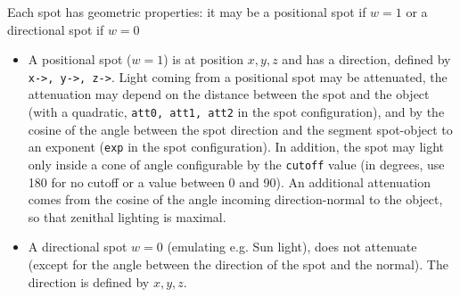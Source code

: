 \documentclass{article}
\begin{document}
Each spot has geometric properties: it may be a positional spot
if $w=1$ or a directional spot if $w=0$
\begin{itemize}
\item  A positional spot ($w=1$) is
at position $x,y,z$ and has a direction, defined by 
\verb|x->, y->, z->|. Light coming from a positional spot may
be attenuated, the attenuation may depend on the distance between
the spot and the object (with a quadratic, 
\verb|att0, att1, att2| in the spot configuration), and by the
cosine of the angle between the spot direction and the segment
spot-object to an exponent (\verb|exp| in the spot configuration).
In addition, the spot may light only inside a cone of angle
configurable by the \verb|cutoff| value (in degrees, use 180
for no cutoff or a value between 0 and 90). An additional attenuation
comes from the cosine of the angle incoming direction-normal to the
object, so that zenithal lighting is maximal.
\item A directional spot $w=0$ (emulating e.g. Sun light), does not
attenuate (except for the angle between the direction of the
spot and the normal). The direction is defined by $x,y,z$.
\end{itemize}
\end{document}

